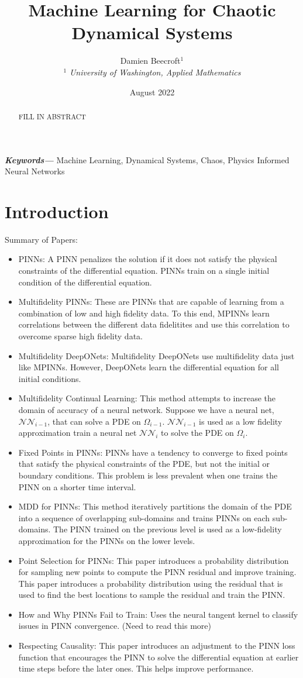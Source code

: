 \documentclass[11pt]{article}
\date{August 2022}
\title{Machine Learning for Chaotic Dynamical Systems}
\author{Damien Beecroft$^{1}$  \\
        \small $^{1}$ \it{University of Washington, Applied Mathematics} \\
}
\providecommand{\keywords}[1]
{
  \small	
  \textbf{\textit{Keywords---}} #1
}
\begin{document}
\maketitle
\begin{abstract}
FILL IN ABSTRACT
\end{abstract} \hspace{10pt}

\keywords{Machine Learning, Dynamical Systems, Chaos, Physics Informed Neural Networks}
\section{Introduction}
Summary of Papers:
\begin{itemize}
\item PINNs: A PINN penalizes the solution if it does not satisfy the physical constraints of the differential equation. PINNs train on a single initial condition of the differential equation.
\item Multifidelity PINNs: These are PINNs that are capable of learning from a combination of low and high fidelity data. To this end, MPINNs learn correlations between the different data fidelitites and use this correlation to overcome sparse high fidelity data.
\item Multifidelity DeepONets: Multifidelity DeepONets use multifidelity data just like MPINNs. However, DeepONets learn the differential equation for all initial conditions.
\item Multifidelity Continual Learning: This method attempts to increase the domain of accuracy of a neural network. Suppose we have a neural net, $\mathcal{NN}_{i-1}$, that can solve a PDE on $\Omega_{i-1}$. $\mathcal{NN}_{i-1}$ is used as a low fidelity approximation train a neural net $\mathcal{NN}_i$ to solve the PDE on $\Omega_i$.
\item Fixed Points in PINNs: PINNs have a tendency to converge to fixed points that satisfy the physical constraints of the PDE, but not the initial or boundary conditions. This problem is less prevalent when one trains the PINN on a shorter time interval.
\item MDD for PINNs: This method iteratively partitions the domain of the PDE into a sequence of overlapping sub-domains and trains PINNs on each sub-domains. The PINN trained on the previous level is used as a low-fidelity approximation for the PINNs on the lower levels.
\item Point Selection for PINNs: This paper introduces a probability distribution for sampling new points to compute the PINN residual and improve training.
This paper introduces a probability distribution using the residual that is used to find the best locations to sample the residual and train the PINN.
\item How and Why PINNs Fail to Train: Uses the neural tangent kernel to classify issues in PINN convergence. (Need to read this more)
\item Respecting Causality: This paper introduces an adjustment to the PINN loss function that encourages the PINN to solve the differential equation at earlier time steps before the later ones. This helps improve performance.
\end{itemize}
\end{document}

